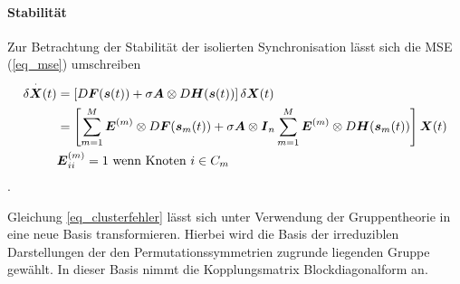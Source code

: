 \paragraph{Stabilität}
Zur Betrachtung der Stabilität der isolierten Synchronisation lässt sich die MSE (\ref{eq_mse}) umschreiben
\begin{align*}
	\label{eq_clusterfehler}
	\delta\overset{\cdot}{\boldsymbol{X}}(t)&=	
	\left[D\boldsymbol{F}(\boldsymbol{s}(t))+\sigma\boldsymbol{A}\otimes D\boldsymbol{H}(\boldsymbol{s}(t))\right]\delta\boldsymbol{X}(t)\\&=
	\left[\sum_{m=1}^{M} \boldsymbol{E}^{(m)} \otimes D\boldsymbol{F}(\boldsymbol{s}_m(t))+\sigma\boldsymbol{A}\otimes \boldsymbol{I}_n\sum_{m=1}^{M} 			\boldsymbol{E}^{(m)}\otimes D\boldsymbol{H}(\boldsymbol{s}_m(t))\right]\boldsymbol{X}(t)
	\\\notag & \boldsymbol{E}^{(m)}_{ii} =1\text{ wenn Knoten }i \in C_m
	\end{align*}.
	
Gleichung \ref{eq_clusterfehler} lässt sich unter Verwendung der Gruppentheorie in eine neue Basis transformieren. Hierbei wird die Basis der  irreduziblen Darstellungen der den Permutationssymmetrien  zugrunde liegenden Gruppe gewählt. In dieser Basis nimmt die Kopplungsmatrix Blockdiagonalform an.


